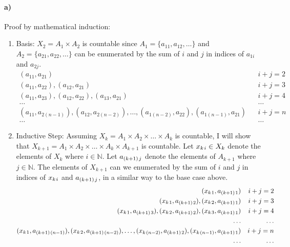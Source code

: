 \documentclass[12pt]{article}
\newcommand\+{\mkern2mu}
\begin{document}
\paragraph{a)}
Proof by mathematical induction:
\begin{enumerate}
\item Basis: $X_2 = A_1 \times A_2$ is countable since $A_1 = \{a_{11}, a_{12}, \dotsc \}$ and $A_2 = \{a_{21}, a_{22}, \dotsc \}$ can be enumerated by the sum of $i$ and $j$ in indices of $a_{1i}$ and $a_{2j}$.
\begin{align*}
(a_{11}, a_{21}) && i + j = 2 \\
(a_{11}, a_{22}), (a_{12}, a_{21}) && i + j = 3 \\
(a_{11}, a_{23}), (a_{12}, a_{22}), (a_{13}, a_{21}) && i + j = 4 \\
\dotsc && \dotsc \\
(a_{11}, a_{2(n-1)}), (a_{12}, a_{2(n-2)}), \dotsc, (a_{1(n-2)}, a_{22}), (a_{1(n-1)}, a_{21}) && i + j = n\\
\dotsc && \dotsc
\end{align*}
\item Inductive Step: Assuming $X_k = A_1 \times A_2 \times \dotsc \times A_k$ is countable, I will show that $X_{k+1} = A_1 \times A_2 \times \dotsc \times A_k \times A_{k+1}$ is countable.
Let $x_{k \+ i} \in X_k$ denote the elements of $X_k$ where $i \in \mathbb{N}$.
Let $a_{(k+1) \+ j}$ denote the elements of $A_{k+1}$ where $j \in \mathbb{N}$.
The elements of $X_{k+1}$ can we enumerated by the sum of $i$ and $j$ in indices of $x_{k \+ i}$ and $a_{(k+1) \+ j}$, in a similar way to the base case above.
\begin{align*}
(x_{k \+ 1}, a_{(k+1) \+ 1}) && i + j = 2 \\
(x_{k \+ 1}, a_{(k+1) \+ 2}), (x_{k \+ 2}, a_{(k+1) \+ 1}) && i + j = 3 \\
(x_{k \+ 1}, a_{(k+1) \+ 3}), (x_{k \+ 2}, a_{(k+1) \+ 2}), (x_{k \+ 3}, a_{(k+1) \+ 1}) && i + j = 4 \\
\dotsc && \dotsc \\
(x_{k \+ 1}, a_{(k+1) \+ (n-1)}), (x_{k \+ 2}, a_{(k+1) \+ (n-2)}), \dotsc, (x_{k \+ (n-2)}, a_{(k+1) \+ 2}), (x_{k \+ (n-1)}, a_{(k+1) \+ 1}) && i + j = n\\
\dotsc && \dotsc
\end{align*}
\end{enumerate}
\end{document}
